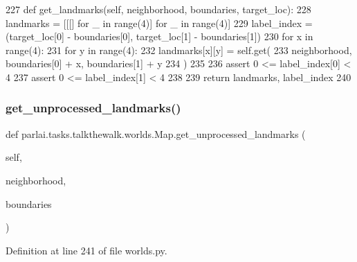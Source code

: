 \begin{DoxyCode}
227     \textcolor{keyword}{def }get\_landmarks(self, neighborhood, boundaries, target\_loc):
228         landmarks = [[[] \textcolor{keywordflow}{for} \_ \textcolor{keywordflow}{in} range(4)] \textcolor{keywordflow}{for} \_ \textcolor{keywordflow}{in} range(4)]
229         label\_index = (target\_loc[0] - boundaries[0], target\_loc[1] - boundaries[1])
230         \textcolor{keywordflow}{for} x \textcolor{keywordflow}{in} range(4):
231             \textcolor{keywordflow}{for} y \textcolor{keywordflow}{in} range(4):
232                 landmarks[x][y] = self.get(
233                     neighborhood, boundaries[0] + x, boundaries[1] + y
234                 )
235 
236         \textcolor{keyword}{assert} 0 <= label\_index[0] < 4
237         \textcolor{keyword}{assert} 0 <= label\_index[1] < 4
238 
239         \textcolor{keywordflow}{return} landmarks, label\_index
240 
\end{DoxyCode}
\mbox{\label{classparlai_1_1tasks_1_1talkthewalk_1_1worlds_1_1Map_adc7aa565cd5b7e90f6741e1b90632b92}} 
\subsubsection{\texorpdfstring{get\+\_\+unprocessed\+\_\+landmarks()}{get\_unprocessed\_landmarks()}}
{\footnotesize\ttfamily def parlai.\+tasks.\+talkthewalk.\+worlds.\+Map.\+get\+\_\+unprocessed\+\_\+landmarks (\begin{DoxyParamCaption}\item[{}]{self,  }\item[{}]{neighborhood,  }\item[{}]{boundaries }\end{DoxyParamCaption})}



Definition at line 241 of file worlds.\+py.


